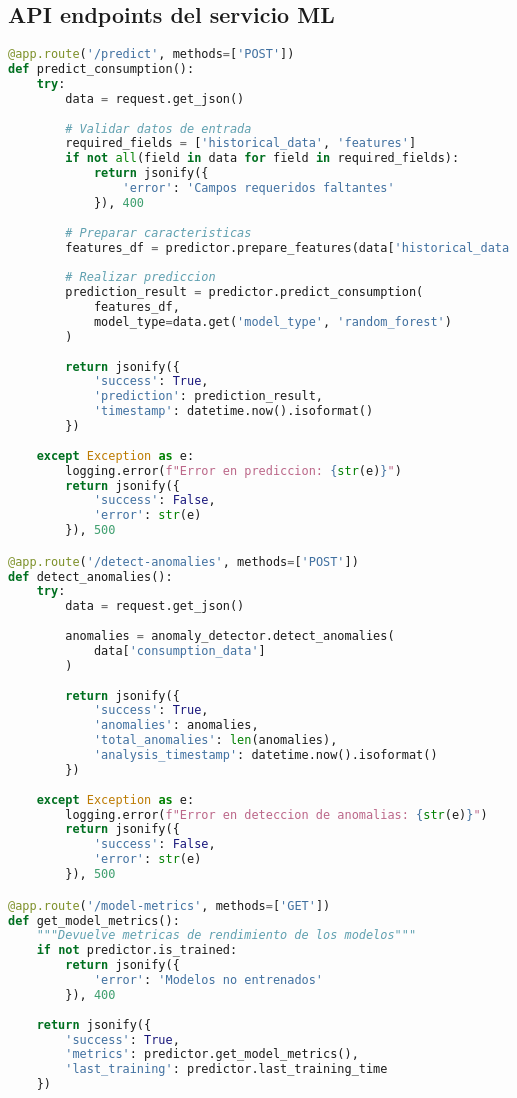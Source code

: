 \subsection{API endpoints del servicio ML}

\begin{lstlisting}[language=Python, caption=Endpoints de la API ML]
@app.route('/predict', methods=['POST'])
def predict_consumption():
    try:
        data = request.get_json()
        
        # Validar datos de entrada
        required_fields = ['historical_data', 'features']
        if not all(field in data for field in required_fields):
            return jsonify({
                'error': 'Campos requeridos faltantes'
            }), 400
        
        # Preparar caracteristicas
        features_df = predictor.prepare_features(data['historical_data'])
        
        # Realizar prediccion
        prediction_result = predictor.predict_consumption(
            features_df, 
            model_type=data.get('model_type', 'random_forest')
        )
        
        return jsonify({
            'success': True,
            'prediction': prediction_result,
            'timestamp': datetime.now().isoformat()
        })
        
    except Exception as e:
        logging.error(f"Error en prediccion: {str(e)}")
        return jsonify({
            'success': False,
            'error': str(e)
        }), 500

@app.route('/detect-anomalies', methods=['POST'])
def detect_anomalies():
    try:
        data = request.get_json()
        
        anomalies = anomaly_detector.detect_anomalies(
            data['consumption_data']
        )
        
        return jsonify({
            'success': True,
            'anomalies': anomalies,
            'total_anomalies': len(anomalies),
            'analysis_timestamp': datetime.now().isoformat()
        })
        
    except Exception as e:
        logging.error(f"Error en deteccion de anomalias: {str(e)}")
        return jsonify({
            'success': False,
            'error': str(e)
        }), 500

@app.route('/model-metrics', methods=['GET'])
def get_model_metrics():
    """Devuelve metricas de rendimiento de los modelos"""
    if not predictor.is_trained:
        return jsonify({
            'error': 'Modelos no entrenados'
        }), 400
    
    return jsonify({
        'success': True,
        'metrics': predictor.get_model_metrics(),
        'last_training': predictor.last_training_time
    })
\end{lstlisting}

